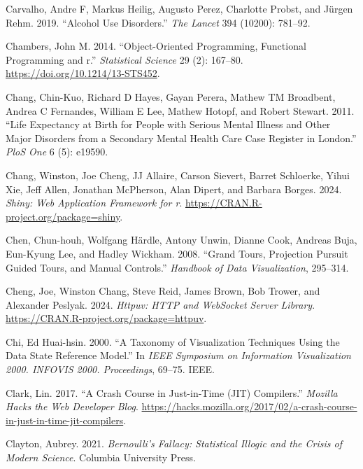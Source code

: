 \documentclass[
]{book}
\newlength{\cslhangindent}
\newenvironment{CSLReferences}[2] %
 {\begin{list}{}{%
  \setlength{\itemindent}{0pt}
  \setlength{\leftmargin}{0pt}
  \setlength{\parsep}{0pt}
  \ifodd #1
   \setlength{\leftmargin}{\cslhangindent}
   \setlength{\itemindent}{-1\cslhangindent}
  \fi
  \setlength{\itemsep}{#2\baselineskip}}}
 {\end{list}}
\theoremstyle{definition}
\theoremstyle{definition}
\theoremstyle{definition}
\theoremstyle{definition}
\theoremstyle{remark}
\begin{document}
\begin{CSLReferences}{1}{0}
Carvalho, Andre F, Markus Heilig, Augusto Perez, Charlotte Probst, and Jürgen Rehm. 2019. {``Alcohol Use Disorders.''} \emph{The Lancet} 394 (10200): 781--92.

Chambers, John M. 2014. {``Object-Oriented Programming, Functional Programming and r.''} \emph{Statistical Science} 29 (2): 167--80. \url{https://doi.org/10.1214/13-STS452}.

Chang, Chin-Kuo, Richard D Hayes, Gayan Perera, Mathew TM Broadbent, Andrea C Fernandes, William E Lee, Mathew Hotopf, and Robert Stewart. 2011. {``Life Expectancy at Birth for People with Serious Mental Illness and Other Major Disorders from a Secondary Mental Health Care Case Register in London.''} \emph{PloS One} 6 (5): e19590.

Chang, Winston, Joe Cheng, JJ Allaire, Carson Sievert, Barret Schloerke, Yihui Xie, Jeff Allen, Jonathan McPherson, Alan Dipert, and Barbara Borges. 2024. \emph{Shiny: Web Application Framework for r}. \url{https://CRAN.R-project.org/package=shiny}.

Chen, Chun-houh, Wolfgang Härdle, Antony Unwin, Dianne Cook, Andreas Buja, Eun-Kyung Lee, and Hadley Wickham. 2008. {``Grand Tours, Projection Pursuit Guided Tours, and Manual Controls.''} \emph{Handbook of Data Visualization}, 295--314.

Cheng, Joe, Winston Chang, Steve Reid, James Brown, Bob Trower, and Alexander Peslyak. 2024. \emph{Httpuv: HTTP and WebSocket Server Library}. \url{https://CRAN.R-project.org/package=httpuv}.

Chi, Ed Huai-hsin. 2000. {``A Taxonomy of Visualization Techniques Using the Data State Reference Model.''} In \emph{IEEE Symposium on Information Visualization 2000. INFOVIS 2000. Proceedings}, 69--75. IEEE.

Clark, Lin. 2017. {``A Crash Course in Just-in-Time (JIT) Compilers.''} \emph{Mozilla Hacks {\textendash} the Web Developer Blog}. \url{https://hacks.mozilla.org/2017/02/a-crash-course-in-just-in-time-jit-compilers}.

Clayton, Aubrey. 2021. \emph{Bernoulli's Fallacy: Statistical Illogic and the Crisis of Modern Science}. Columbia University Press.


\end{CSLReferences}
\end{document}
